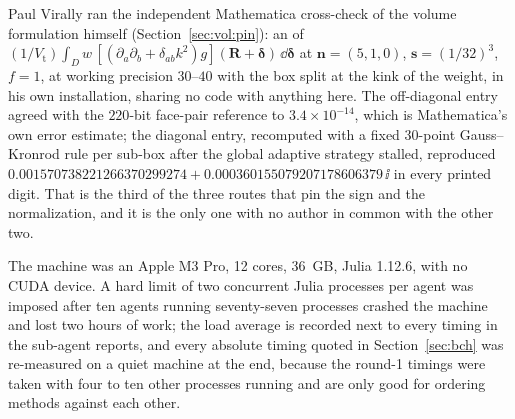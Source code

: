 Paul Virally ran the independent Mathematica cross-check of the volume formulation himself
(Section~\ref{sec:vol:pin}): an  of
$(1/V_{\mathrm{t}})\int_D w\,[(\partial_a\partial_b + \delta_{ab}k^2)g](\mathbf{R}+
\boldsymbol\delta)\,\dd\boldsymbol\delta$ at $\mathbf{n} = (5,1,0)$,
$\mathbf{s} = (1/32)^3$, $f = 1$, at working precision $30$--$40$ with the box split at the
kink of the weight, in his own installation, sharing no code with anything here. The
off-diagonal entry agreed with the $220$-bit face-pair reference to $3.4\times10^{-14}$,
which is Mathematica's own error estimate; the diagonal entry, recomputed with a fixed
$30$-point Gauss--Kronrod rule per sub-box after the global adaptive strategy stalled,
reproduced $0.001570738221266370299274 + 0.000360155079207178606379\,\ii$ in every printed
digit. That is the third of the three routes that pin the sign and the normalization, and it
is the only one with no author in common with the other two.

The machine was an Apple M3 Pro, 12 cores, 36~GB, Julia 1.12.6, with no CUDA device. A
hard limit of two concurrent Julia processes per agent was imposed after ten agents running
seventy-seven processes crashed the machine and lost two hours of work; the load average is
recorded next to every timing in the sub-agent reports, and every absolute timing quoted in
Section~\ref{sec:bch} was re-measured on a quiet machine at the end, because the round-1
timings were taken with four to ten other processes running and are only good for ordering
methods against each other.
